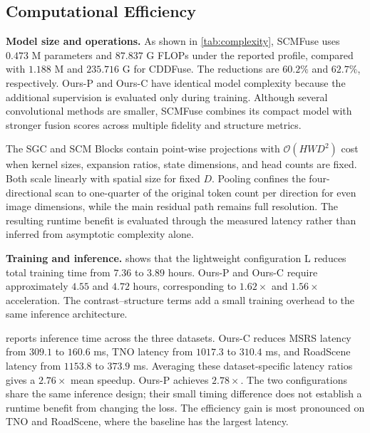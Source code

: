 \subsection{Computational Efficiency}\label{subsec:efficiency}


\textbf{Model size and operations.}
As shown in \cref{tab:complexity}, SCMFuse uses $0.473$ M parameters and $87.837$ G FLOPs under the reported profile, compared with $1.188$ M and $235.716$ G for CDDFuse. The reductions are $60.2\%$ and $62.7\%$, respectively. Ours-P and Ours-C have identical model complexity because the additional supervision is evaluated only during training. Although several convolutional methods are smaller, SCMFuse combines its compact model with stronger fusion scores across multiple fidelity and structure metrics.

The SGC and SCM Blocks contain point-wise projections with $\mathcal O(HWD^2)$ cost when kernel sizes, expansion ratios, state dimensions, and head counts are fixed. Both scale linearly with spatial size for fixed $D$. Pooling confines the four-directional scan to one-quarter of the original token count per direction for even image dimensions, while the main residual path remains full resolution. The resulting runtime benefit is evaluated through the measured latency rather than inferred from asymptotic complexity alone.

\textbf{Training and inference.}
 shows that the lightweight configuration L reduces total training time from $7.36$ to $3.89$ hours. Ours-P and Ours-C require approximately $4.55$ and $4.72$ hours, corresponding to $1.62\times$ and $1.56\times$ acceleration. The contrast--structure terms add a small training overhead to the same inference architecture.


 reports inference time across the three datasets. Ours-C reduces MSRS latency from $309.1$ to $160.6$ ms, TNO latency from $1017.3$ to $310.4$ ms, and RoadScene latency from $1153.8$ to $373.9$ ms. Averaging these dataset-specific latency ratios gives a $2.76\times$ mean speedup. Ours-P achieves $2.78\times$. The two configurations share the same inference design; their small timing difference does not establish a runtime benefit from changing the loss. The efficiency gain is most pronounced on TNO and RoadScene, where the baseline has the largest latency.

